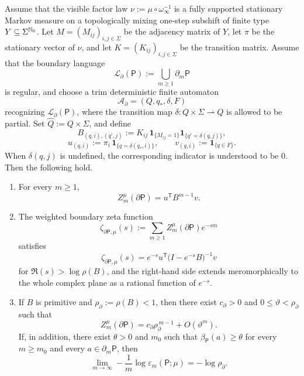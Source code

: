 \begin{theorem}
\label{thm:weighted-boundary-transfer}
Assume that the visible factor law
\(\nu:=\mu\circ\omega_\infty^{-1}\) is a fully supported stationary
Markov measure on a topologically mixing one-step subshift of finite
type \(Y\subseteq\Sigma^{\mathbb{N}_0}\).  Let \(M=(M_{ij})_{i,j\in\Sigma}\)
be the adjacency matrix of \(Y\), let \(\pi\) be the stationary vector
of \(\nu\), and let \(K=(K_{ij})_{i,j\in\Sigma}\) be the transition
matrix.  Assume that the boundary language
\[
  \mathcal{L}_\partial(\mathsf{P})
  := \bigcup_{m\geq 1}\partial_m\mathsf{P}
\]
is regular, and choose a trim deterministic finite automaton
\[
  \mathcal{A}_\partial=(Q,q_\ast,\delta,F)
\]
recognizing \(\mathcal{L}_\partial(\mathsf{P})\), where the transition
map \(\delta:Q\times\Sigma\rightharpoonup Q\) is allowed to be partial.
Set \(\widehat Q:=Q\times\Sigma\), and define
\[
  B_{(q,i),(q',j)}
  := K_{ij}\,
     \mathbf{1}_{\{M_{ij}=1\}}
     \mathbf{1}_{\{q'=\delta(q,j)\}},
\]
\[
  u_{(q,i)}:=\pi_i\,\mathbf{1}_{\{q=\delta(q_\ast,i)\}},
  \qquad
  v_{(q,i)}:=\mathbf{1}_{\{q\in F\}}.
\]
When \(\delta(q,j)\) is undefined, the corresponding indicator is
understood to be \(0\).
Then the following hold.
\begin{enumerate}[label=(\roman*)]
  \item For every \(m\geq 1\),
    \[
      Z_m^\mu(\partial\mathsf{P})=u^{\mathsf T}B^{m-1}v.
    \]
  \item The weighted boundary zeta function
    \[
      \zeta_{\partial\mathsf{P},\mu}(s)
      := \sum_{m\geq 1}
          Z_m^\mu(\partial\mathsf{P})e^{-sm}
    \]
    satisfies
    \[
      \zeta_{\partial\mathsf{P},\mu}(s)
      = e^{-s}u^{\mathsf T}
        \bigl(I-e^{-s}B\bigr)^{-1}v
    \]
    for \(\Re(s)>\log\rho(B)\), and the right-hand side extends
    meromorphically to the whole complex plane as a rational function of
    \(e^{-s}\).
  \item If \(B\) is primitive and \(\rho_\partial:=\rho(B)<1\), then
    there exist \(c_\partial>0\) and \(0\leq \vartheta<\rho_\partial\)
    such that
    \[
      Z_m^\mu(\partial\mathsf{P})
      = c_\partial\rho_\partial^{\,m-1}+O(\vartheta^m).
    \]
    If, in addition, there exist \(\theta>0\) and \(m_0\) such that
    \(\beta_{\mathsf{P}}(a)\geq \theta\) for every
    \(m\geq m_0\) and every \(a\in\partial_m\mathsf{P}\), then
    \[
      \lim_{m\to\infty}
      -\frac{1}{m}\log \varepsilon_m(\mathsf{P};\mu)
      = -\log\rho_\partial.
    \]
\end{enumerate}
\end{theorem}

